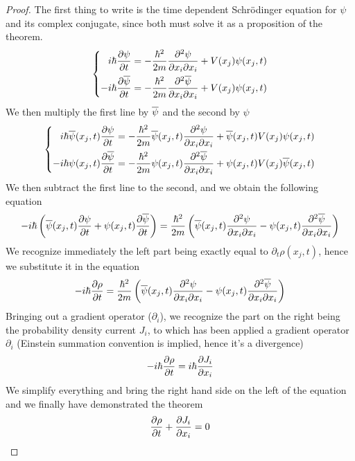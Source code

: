 \documentclass[../qm.tex]{subfiles}
\begin{document}
	\begin{proof}
		The first thing to write is the time dependent Schrödinger equation for $\psi$ and its complex conjugate, since both must solve it as a proposition of the theorem.
		\begin{equation*}
			\left\{\begin{aligned}
					i\hbar\pdv{\psi}{t}&=-\frac{\hbar^2}{2m}\pdv{\psi}{x_i}{x_i}+V(x_j)\psi(x_j,t)\\
					-i\hbar\pdv{\overline{\psi}}{t}&=-\frac{\hbar^2}{2m}\pdv{\overline{\psi}}{x_i}{x_i}+V(x_j)\psi(x_j,t)
			\end{aligned}\right.
		\end{equation*}
		We then multiply the first line by $\overline{\psi}$ and the second by $\psi$
		\begin{equation*}
			\left\{\begin{aligned}
				i\hbar\overline{\psi}(x_j,t)\pdv{\psi}{t}&=-\frac{\hbar^2}{2m}\overline{\psi}(x_j,t)\pdv{\psi}{x_i}{x_i}+\overline{\psi}(x_j,t)V(x_j)\psi(x_j,t)\\
				-i\hbar\psi(x_j,t)\pdv{\overline{\psi}}{t}&=-\frac{\hbar^2}{2m}\psi(x_j,t)\pdv{\overline{\psi}}{x_i}{x_i}+\psi(x_j,t)V(x_j)\overline{\psi}(x_j,t)
			\end{aligned}\right.
		\end{equation*}
		We then subtract the first line to the second, and we obtain the following equation
		\begin{equation*}
			-i\hbar\left( \overline{\psi}(x_j,t)\pdv{\psi}{t}+\psi(x_j,t)\pdv{\overline{\psi}}{t} \right)=\frac{\hbar^2}{2m}\left( \overline{\psi}(x_j,t)\pdv{\psi}{x_i}{x_i}-\psi(x_j,t)\pdv{\overline{\psi}}{x_i}{x_i} \right)
		\end{equation*}
		We recognize immediately the left part being exactly equal to $\partial_t\rho(x_j,t)$, hence we substitute it in the equation
		\begin{equation*}
			-i\hbar\pdv{\rho}{t}=\frac{\hbar^2}{2m}\left( \overline{\psi}(x_j,t)\pdv{\psi}{x_i}{x_i}-\psi(x_j,t)\pdv{\overline{\psi}}{x_i}{x_i} \right)
		\end{equation*}
		Bringing out a gradient operator ($\partial_i$), we recognize the part on the right being the probability density current $J_i$, to which has been applied a gradient operator $\partial_i$ (Einstein summation convention is implied, hence it's a divergence)
		\begin{equation*}
			-i\hbar\pdv{\rho}{t}=i\hbar\pdv{J_i}{x_i}
		\end{equation*}
		We simplify everything and bring the right hand side on the left of the equation and we finally have demonstrated the theorem
		\begin{equation*}
			\pdv{\rho}{t}+\pdv{J_i}{x_i}=0
		\end{equation*}
	\end{proof}
\end{document}
